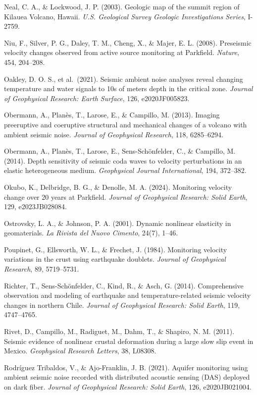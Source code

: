 \documentclass[draft]{agujournal2019}
\begin{document}
Neal, C. A., \& Lockwood, J. P. (2003). Geologic map of the summit
region of Kilauea Volcano, Hawaii. \emph{U.S. Geological Survey Geologic
Investigations Series}, I-2759.

Niu, F., Silver, P. G., Daley, T. M., Cheng, X., \& Majer, E. L. (2008).
Preseismic velocity changes observed from active source monitoring at
Parkfield. \emph{Nature}, 454, 204--208.

Oakley, D. O. S., et al.~(2021). Seismic ambient noise analyses reveal
changing temperature and water signals to 10s of meters depth in the
critical zone. \emph{Journal of Geophysical Research: Earth Surface},
126, e2020JF005823.

Obermann, A., Planès, T., Larose, E., \& Campillo, M. (2013). Imaging
preeruptive and coeruptive structural and mechanical changes of a
volcano with ambient seismic noise. \emph{Journal of Geophysical
Research}, 118, 6285--6294.

Obermann, A., Planès, T., Larose, E., Sens-Schönfelder, C., \& Campillo,
M. (2014). Depth sensitivity of seismic coda waves to velocity
perturbations in an elastic heterogeneous medium. \emph{Geophysical
Journal International}, 194, 372--382.

Okubo, K., Delbridge, B. G., \& Denolle, M. A. (2024). Monitoring
velocity change over 20 years at Parkfield. \emph{Journal of Geophysical
Research: Solid Earth}, 129, e2023JB028084.

Ostrovsky, L. A., \& Johnson, P. A. (2001). Dynamic nonlinear elasticity
in geomaterials. \emph{La Rivista del Nuovo Cimento}, 24(7), 1--46.

Poupinet, G., Ellsworth, W. L., \& Frechet, J. (1984). Monitoring
velocity variations in the crust using earthquake doublets.
\emph{Journal of Geophysical Research}, 89, 5719--5731.

Richter, T., Sens-Schönfelder, C., Kind, R., \& Asch, G. (2014).
Comprehensive observation and modeling of earthquake and
temperature-related seismic velocity changes in northern Chile.
\emph{Journal of Geophysical Research: Solid Earth}, 119, 4747--4765.

Rivet, D., Campillo, M., Radiguet, M., Dahm, T., \& Shapiro, N. M.
(2011). Seismic evidence of nonlinear crustal deformation during a large
slow slip event in Mexico. \emph{Geophysical Research Letters}, 38,
L08308.

Rodríguez Tribaldos, V., \& Ajo-Franklin, J. B. (2021). Aquifer
monitoring using ambient seismic noise recorded with distributed
acoustic sensing (DAS) deployed on dark fiber. \emph{Journal of
Geophysical Research: Solid Earth}, 126, e2020JB021004.
\end{document}
